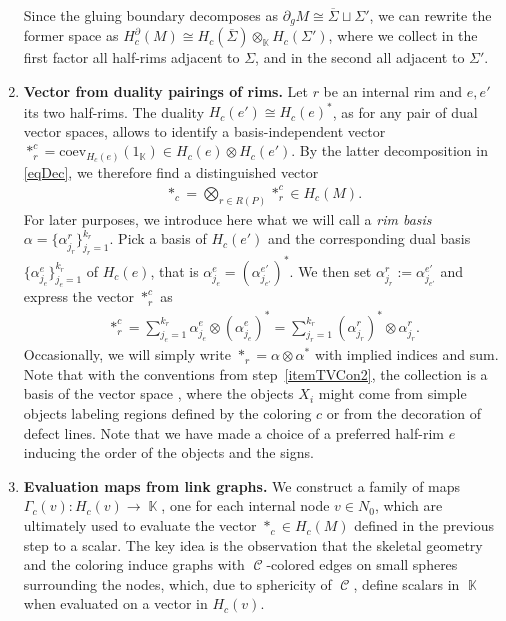 \documentclass[pdftex]{sigma}
\DeclareMathOperator{\Hom}{Hom}
\DeclareMathOperator{\K}{\mathbb{K}}
\DeclareMathOperator{\calc}{\mathcal{C}}
\numberwithin{equation}{section}
\theoremstyle{definition}
\begin{document}
\begin{enumerate}
 Since the gluing boundary decomposes as $\partial_gM \cong \overline{\Sigma} \sqcup \Sigma'$, we can rewrite the former space as $H_c^{\partial}(M) \cong H_c(\overline{\Sigma}) \otimes_{\K} H_c(\Sigma')$, where we collect in the first factor all half-rims adjacent to $\Sigma$, and in the second all adjacent to $\Sigma'$.
 \item \textbf{Vector from duality pairings of rims.} Let $r$ be an internal rim and $e, e'$ its two half-rims. The duality $H_c(e') \cong H_c(e)^*$, as for any pair of dual vector spaces, allows to identify a basis-independent vector $*_r^c = \mathrm{coev}_{H_c(e)}(1_{\K}) \in H_c(e) \otimes H_c(e')$. By the latter decomposition in \eqref{eqDec}, we therefore find a distinguished vector
 \begin{align*}
 *_c = \bigotimes_{r \in R(P)} *_r^c \in H_c(M).
 \end{align*}
 For later purposes, we introduce here what we will call a \textit{rim basis} $\alpha = \{\alpha_{j_r}^r\}_{j_r=1}^{k_r}$. Pick a basis  of $H_c(e')$ and the corresponding dual basis $\{\alpha_{j_{e}}^{e}\}_{j_{e}=1}^{k_r}$ of $H_c(e)$, that is $\alpha_{j_e}^e = (\alpha_{j_{e'}}^{e'})^* $. We then set $\alpha_{j_r}^r := \alpha_{j_{e'}}^{e'}$ and express the vector $*_r^c$ as
 \begin{align*}
 *_r^c = \sum_{j_e = 1}^{k_r} \alpha_{j_e}^e \otimes (\alpha_{j_e}^e)^* = \sum_{j_r = 1}^{k_r} (\alpha_{j_r}^r)^*\otimes \alpha_{j_r}^r.
 \end{align*}
 Occasionally, we will simply write $*_r = \alpha \otimes \alpha^*$ with implied indices and sum. Note that with the conventions from step~\ref{itemTVCon2}, the collection  is a basis of the vector space \smash{$ \Hom_{\calc}\bigl(X_1^{\varepsilon(1)} \otimes \dots \otimes X_k^{\varepsilon(k)}, \mathbbm{1}\bigr)$}, where the objects $X_i$ might come from simple objects labeling regions defined by the coloring $c$ or from the decoration of defect lines. Note that we have made a choice of a preferred half-rim $e$ inducing the order of the objects and the signs.
 \item \textbf{Evaluation maps from link graphs.} We construct a family of maps $\Gamma_c(v)\colon H_c(v) \rightarrow \K$, one for each internal node $v \in N_0$, which are ultimately used to evaluate the vector $*_c \in H_c(M)$ defined in the previous step to a scalar. The key idea is the observation that the skeletal geometry and the coloring induce graphs with $\calc$-colored edges on small spheres surrounding the nodes, which, due to sphericity of $\calc$, define scalars in $\K$ when evaluated on a vector in $H_c(v)$.


\end{enumerate}
\end{document}
